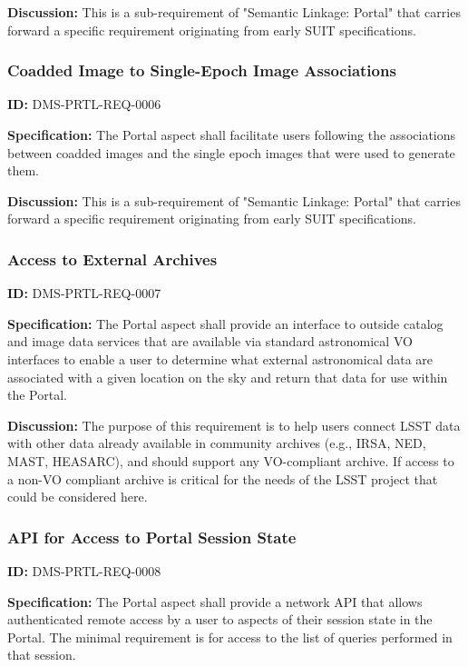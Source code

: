 \documentclass[SE,toc,lsstdraft]{lsstdoc}
\begin{document}
\textbf{Discussion:}
This is a sub-requirement of "Semantic Linkage: Portal" that carries forward a specific requirement originating from early SUIT specifications.

\subsubsection{Coadded Image to Single-Epoch Image Associations}

\label{DMS-PRTL-REQ-0006}
\textbf{ID:} DMS-PRTL-REQ-0006

\textbf{Specification:}
The Portal aspect shall facilitate users following the associations between coadded images and the single epoch images that were used to generate them.

\textbf{Discussion:}
This is a sub-requirement of "Semantic Linkage: Portal" that carries forward a specific requirement originating from early SUIT specifications.

\subsubsection{Access to External Archives}

\label{DMS-PRTL-REQ-0007}
\textbf{ID:} DMS-PRTL-REQ-0007

\textbf{Specification:}
The Portal aspect shall provide an interface to outside catalog and image data services that are available via standard astronomical VO interfaces to enable a user to determine what external astronomical data are associated with a given location on the sky and return that data for use within the Portal.

\textbf{Discussion:}
The purpose of this requirement is to help users connect LSST data with other data already available in community archives (e.g., IRSA, NED, MAST, HEASARC), and should support any VO-compliant archive.  If access to a non-VO compliant archive is critical for the needs of the LSST project that could be considered here.

\subsubsection{API for Access to Portal Session State}

\label{DMS-PRTL-REQ-0008}
\textbf{ID:} DMS-PRTL-REQ-0008

\textbf{Specification:}
The Portal aspect shall provide a network API that allows authenticated remote access by a user to aspects of their session state in the Portal.  The minimal requirement is for access to the list of queries performed in that session.
\end{document}

